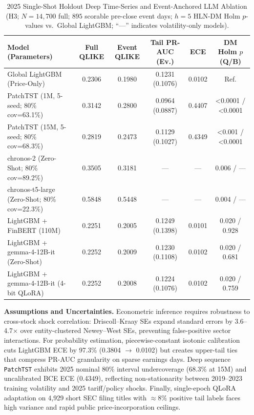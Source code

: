 \documentclass[11pt,a4paper]{article}
\begin{document}
\begin{table}[!htb]
\centering
\caption{2025 Single-Shot Holdout Deep Time-Series and Event-Anchored LLM Ablation (H3; $N=14{,}700$ full; $895$ scorable pre-close event days; $h=5$ HLN-DM Holm $p$-values vs.\ Global LightGBM; ``---'' indicates volatility-only models).}
\label{tab:h3_summary}
\scriptsize
\setlength{\tabcolsep}{3.5pt}
\begin{tabular}{lccccc}
\toprule
Model (Parameters) & Full QLIKE & Event QLIKE & Tail PR-AUC (Ev.) & ECE & DM Holm $p$ (Q/B) \\
\midrule
Global LightGBM (Price-Only) & 0.2306 & 0.1980 & 0.1231 (0.1076) & 0.0102 & Ref. \\
PatchTST (1M, 5-seed; 80\% cov=63.1\%) & 0.3142 & 0.2800 & 0.0964 (0.0887) & 0.4407 & <0.0001 / <0.0001 \\
PatchTST (15M, 5-seed; 80\% cov=68.3\%) & 0.2819 & 0.2473 & 0.1129 (0.1027) & 0.4349 & <0.001 / <0.0001 \\
chronos-2 (Zero-Shot; 80\% cov=89.2\%) & 0.3505 & 0.3181 & --- & --- & 0.006 / --- \\
chronos-t5-large (Zero-Shot; 80\% cov=22.3\%) & 0.5848 & 0.5448 & --- & --- & 0.004 / --- \\
LightGBM + FinBERT (110M) & 0.2251 & 0.2005 & 0.1249 (0.1398) & 0.0101 & 0.020 / 0.928 \\
LightGBM + gemma-4-12B-it (Zero-Shot) & 0.2252 & 0.2009 & 0.1230 (0.1108) & 0.0102 & 0.020 / 0.681 \\
LightGBM + gemma-4-12B-it (4-bit QLoRA) & 0.2252 & 0.2008 & 0.1224 (0.1076) & 0.0102 & 0.020 / 0.759 \\
\bottomrule
\end{tabular}
\end{table}


\textbf{Assumptions and Uncertainties.} Econometric inference requires
robustness to cross-stock shock correlation: Driscoll--Kraay SEs expand
standard errors by 3.6--4.7$\times$ over entity-clustered Newey--West SEs,
preventing false-positive sector interactions. For probability estimation,
piecewise-constant isotonic calibration cuts LightGBM ECE by
97.3\% (0.3804 $\to$ 0.0102) but
creates upper-tail ties that compress PR-AUC granularity on sparse earnings
days. Deep sequence \texttt{PatchTST} exhibits 2025 nominal 80\% interval
undercoverage (68.3\% at 15M) and uncalibrated BCE ECE (0.4349), reflecting
non-stationarity between 2019--2023 training volatility and 2025 tariff/policy
shocks. Finally, single-epoch QLoRA adaptation on 4,929 short SEC filing
titles with $\approx 8\%$ positive tail labels faces high variance and rapid
public price-incorporation ceilings.
\end{document}
